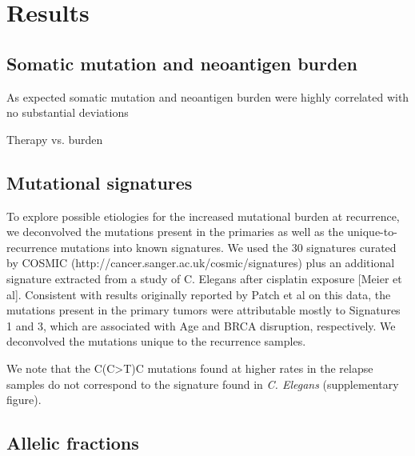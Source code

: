 \section*{Results}
\subsection*{Somatic mutation and neoantigen burden}

As expected somatic mutation and neoantigen burden were highly correlated with no substantial deviations

Therapy vs. burden


\subsection*{Mutational signatures}
To explore possible etiologies for the increased mutational burden at recurrence, we deconvolved the mutations present in the primaries as well as the unique-to-recurrence mutations into known signatures. We used the 30 signatures curated by COSMIC (http://cancer.sanger.ac.uk/cosmic/signatures) plus an additional signature extracted from a study of C. Elegans after cisplatin exposure [Meier et al]. Consistent with results originally reported by Patch et al on this data, the mutations present in the primary tumors were attributable mostly to Signatures 1 and 3, which are associated with Age and BRCA disruption, respectively. We deconvolved the mutations unique to the recurrence samples. 

We note that the C(C>T)C mutations found at higher rates in the relapse samples do not correspond to the signature found in \textit{C. Elegans} (supplementary figure).

\subsection*{Allelic fractions}



